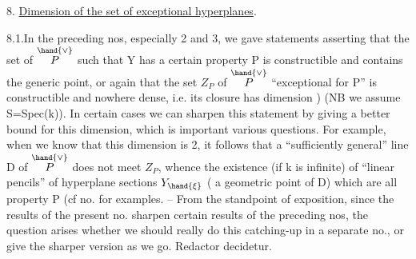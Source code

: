 
8. \uline{Dimension of the set of exceptional hyperplanes}.

8.1.In the preceding nos, especially 2 and 3, we gave
statements asserting that the set of \hand{$\xi\in$} $\overset{\hand{\vee}}{P}$ such that Y has a certain
property P is constructible and contains the generic point,  or
again that the set $Z_P$ of \hand{$\xi\in$} $\overset{\hand{\vee}}{P}$ “exceptional for P” is constructible
and nowhere dense, i.e. its closure has dimension \hand{$\geq$} ) 
(NB we assume S=Spec(k)). In certain cases we can sharpen this statement
by giving a better  bound for this dimension, which is important
 various questions. For example, when we know that this dimension
is \hand{$\geq$} 2, it follows that a “sufficiently general” line D of $\overset{\hand{\vee}}{P}$
does not meet $Z_P$, whence the existence (if k is infinite) of “linear
pencils” of hyperplane sections  $Y_{\hand{\xi}}$ (\hand{$\xi$} a geometric
point of D) which are all property P (cf no.  for examples.
-- From the standpoint of exposition, since the results of the present no.
sharpen certain results of the preceding nos, the question arises whether
we should really do this catching-up in a separate no., or give the
sharper version as we go. Redactor decidetur.

